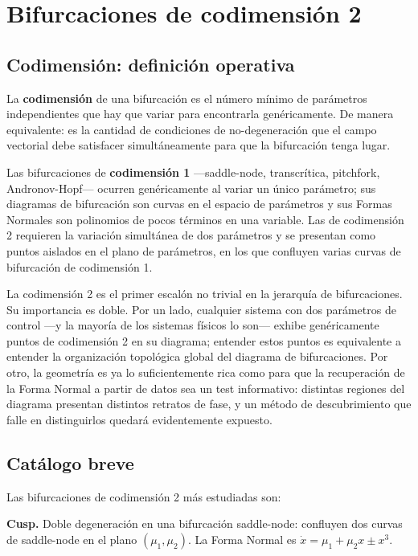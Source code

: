\section{Bifurcaciones de codimensión 2}
\label{3:sec:codim_2}

\subsection{Codimensión: definición operativa}

La \textbf{codimensión} de una bifurcación es el número mínimo de parámetros independientes que hay que variar para encontrarla genéricamente. De manera equivalente: es la cantidad de condiciones de no-degeneración que el campo vectorial debe satisfacer simultáneamente para que la bifurcación tenga lugar.

Las bifurcaciones de \textbf{codimensión 1} —saddle-node, transcrítica, pitchfork, Andronov-Hopf— ocurren genéricamente al variar un único parámetro; sus diagramas de bifurcación son curvas en el espacio de parámetros y sus Formas Normales son polinomios de pocos términos en una variable. Las de codimensión 2 requieren la variación simultánea de dos parámetros y se presentan como puntos aislados en el plano de parámetros, en los que confluyen varias curvas de bifurcación de codimensión 1.

La codimensión 2 es el primer escalón no trivial en la jerarquía de bifurcaciones. Su importancia es doble. Por un lado, cualquier sistema con dos parámetros de control —y la mayoría de los sistemas físicos lo son— exhibe genéricamente puntos de codimensión 2 en su diagrama; entender estos puntos es equivalente a entender la organización topológica global del diagrama de bifurcaciones. Por otro, la geometría es ya lo suficientemente rica como para que la recuperación de la Forma Normal a partir de datos sea un test informativo: distintas regiones del diagrama presentan distintos retratos de fase, y un método de descubrimiento que falle en distinguirlos quedará evidentemente expuesto.

\subsection{Catálogo breve}

Las bifurcaciones de codimensión 2 más estudiadas son:

\textbf{Cusp.} Doble degeneración en una bifurcación saddle-node: confluyen dos curvas de saddle-node en el plano $(\mu_1, \mu_2)$. La Forma Normal es $\dot{x} = \mu_1 + \mu_2 x \pm x^3$.

